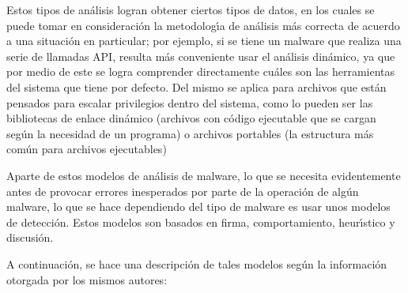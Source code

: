 Estos tipos de an\'alisis logran obtener ciertos tipos de datos, en los cuales se
puede tomar en consideraci\'on la metodolog\'{\i}a de an\'alisis m\'as correcta de acuerdo
a una situaci\'on en particular; por ejemplo, si se tiene un malware que realiza
una serie de llamadas API, resulta m\'as conveniente usar el an\'alisis din\'amico,
ya que por medio de este se logra comprender directamente cu\'ales son las
herramientas del sistema que tiene por defecto. Del mismo se aplica para
archivos que est\'an pensados para escalar privilegios dentro del sistema, como lo
pueden ser las bibliotecas de enlace din\'amico (archivos con c\'odigo ejecutable
que se cargan seg\'un la necesidad de un programa) o archivos portables (la
estructura m\'as com\'un para archivos ejecutables)
\parencite{Aboaoja2022}

Aparte de estos modelos de an\'alisis de malware, lo que se necesita evidentemente
antes de provocar errores inesperados por parte de la operaci\'on de alg\'un
malware, lo que se hace dependiendo del tipo de malware es usar unos modelos de
detecci\'on. Estos modelos son basados en firma, comportamiento, heur\'{\i}stico y
discusi\'on. \parencite{Aboaoja2022}

A continuaci\'on, se hace una descripci\'on de tales modelos seg\'un la informaci\'on
otorgada por los mismos autores:

